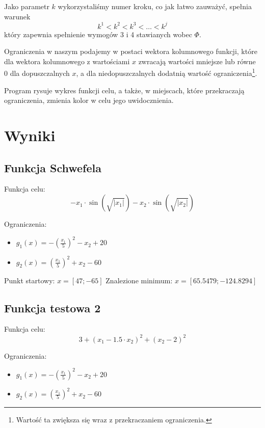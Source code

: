 \documentclass{classrep}
\begin{document}
Jako parametr $k$ wykorzystaliśmy numer kroku, co jak łatwo zauważyć, spełnia warunek
\begin{equation}
 k^1 < k^2 < k^3 < \ldots < k^j
\end{equation}
który zapewnia spełnienie wymogów 3 i 4 stawianych wobec $\Phi$.

Ograniczenia w naszym podajemy w postaci wektora kolumnowego funkcji, które dla wektora kolumnowego z wartościami $x$ zwracają wartości mniejsze lub równe 0 dla dopuszczalnych $x$, a dla niedopuszczalnych \ppauza dodatnią wartość ograniczenia\footnote{Wartość ta zwiększa się wraz z przekraczaniem ograniczenia.}.

Program rysuje wykres funkcji celu, a także, w miejscach, które przekraczają ograniczenia, zmienia kolor w celu jego uwidocznienia.

\section{Wyniki}
\subsection{Funkcja Schwefela}
Funkcja celu:
\begin{equation}
 - x_1 \cdot \sin(\sqrt{\left|x_1\right|}) - x_2 \cdot \sin(\sqrt{\left|x_2\right|})
\end{equation}

Ograniczenia:
\begin{itemize}
 \item $g_1(x) = -\left(\frac{x_1}{5}\right)^2 - x_2 + 20$
 \item $g_2(x) = \left(\frac{x_1}{5}\right)^2 + x_2 - 60$
\end{itemize}

Punkt startowy: $x = [47; -65]$
Znalezione minimum: $x = [65.5479; -124.8294]$

\subsection{Funkcja testowa 2}
Funkcja celu:
\begin{equation}
 3 + (x_1 - 1.5 \cdot x_2)^2 + (x_2 - 2)^2
\end{equation}

Ograniczenia:
\begin{itemize}
 \item $g_1(x) = -\left(\frac{x_1}{5}\right)^2 - x_2 + 20$
 \item $g_2(x) = \left(\frac{x_1}{5}\right)^2 + x_2 - 60$
\end{itemize}
\end{document}
